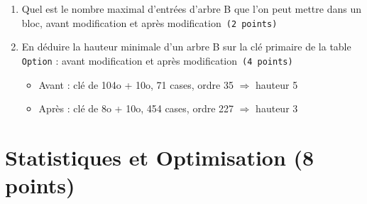 \begin{enumerate}
  \item Quel est le nombre maximal d'entrées d'arbre B que l'on peut mettre dans un bloc,
     avant modification et après modification~{\tt (2~points)}
    \item En déduire la hauteur minimale  d'un arbre B sur la clé primaire de la table {\tt Option} : 
      avant modification et après modification~{\tt (4~points)}
\begin{solution}
\begin{itemize}
  \item Avant : clé de 104o + 10o, 71 cases, ordre 35 $\Rightarrow$ hauteur 5
  \item Après : clé de 8o + 10o, 454 cases, ordre 227 $\Rightarrow$ hauteur 3
\end{itemize}
\end{solution}
\end{enumerate}

\section{Statistiques et Optimisation (8 points)}

